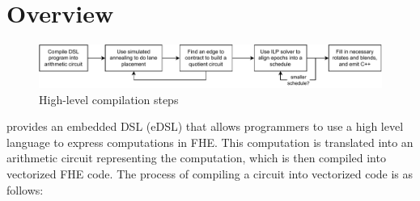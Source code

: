 \section{\system Overview}\label{sec:overview}
\begin{figure}
    \centering
    \includegraphics[width=0.8\linewidth]{figures/coyote_algorithm_overview.drawio.pdf}
    \caption{High-level compilation steps}\label{fig:high-level-compilation-steps}
\end{figure}
\system provides an embedded DSL (eDSL) that allows programmers to use a high level language to express computations in FHE. This computation is translated into an arithmetic circuit representing the computation, which is then compiled into vectorized FHE code. The process of compiling a circuit into vectorized code is as follows: %


 
